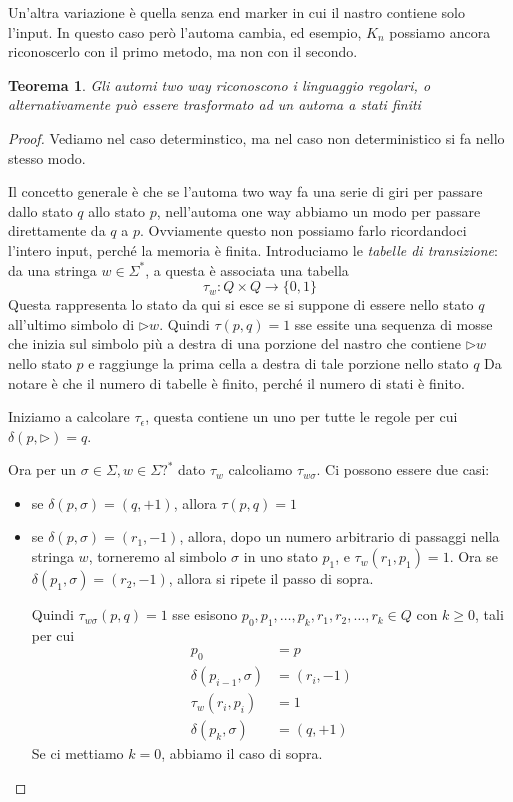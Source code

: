 \documentclass[12pt]{article}
\newtheorem{teorema}{Teorema}
\begin{document}
Un'altra variazione è quella senza end marker in cui il nastro contiene solo l'input.
In questo caso però l'automa cambia, ed esempio, $K_n$ possiamo ancora riconoscerlo con il primo metodo, ma non con il secondo.

\begin{teorema}
	Gli automi two way riconoscono i linguaggio regolari, o alternativamente può essere trasformato ad un automa a stati finiti 
\end{teorema}
\begin{proof}
	Vediamo nel caso determinstico, ma nel caso non deterministico si fa nello stesso modo.

	Il concetto generale è che se l'automa two way fa una serie di giri per passare dallo stato $q$ allo stato $p$, nell'automa one way abbiamo un modo per passare direttamente da $q$ a $p$.
	Ovviamente questo non possiamo farlo ricordandoci l'intero input, perché la memoria è finita.
	Introduciamo le \textit{tabelle di transizione}: da una stringa $w \in \Sigma^*$, a questa è associata una tabella
	$$ \tau_w : Q \times Q \rightarrow \{0, 1\} $$
	Questa rappresenta lo stato da qui si esce se si suppone di essere nello stato $q$ all'ultimo simbolo di $\rhd w$.
	Quindi $\tau(p, q) = 1$ sse essite una sequenza di mosse che inizia sul simbolo più a destra di una porzione del nastro che contiene $\rhd w$ nello stato $p$ e raggiunge la prima cella a destra di tale porzione nello stato $q$
	Da notare è che il numero di tabelle è finito, perché il numero di stati è finito.

	Iniziamo a calcolare $\tau_\epsilon$, questa contiene un uno per tutte le regole per cui $\delta(p, \rhd) = q$.

	Ora per un $\sigma \in \Sigma, w \in \Sigma?^*$ dato $\tau_w$ calcoliamo $\tau_{w\sigma}$.
	Ci possono essere due casi:
	\begin{itemize}
		\item se $\delta(p, \sigma) = (q, +1)$, allora $\tau(p, q) = 1$
		\item se $\delta(p, \sigma) = (r_1, -1)$, allora, dopo un numero arbitrario di passaggi nella stringa $w$, torneremo al simbolo $\sigma$ in uno stato $p_1$, e $\tau_w(r_1, p_1) = 1$.
			Ora se $\delta(p_1, \sigma) = (r_2, -1)$, allora si ripete il passo di sopra.

			Quindi $\tau_{w\sigma}(p, q) = 1$ sse esisono $p_0, p_1, \dots, p_k, r_1, r_2, \dots, r_k \in Q$ con $k \geq 0$, tali per cui 
			\begin{align*}
				p_0 &= p \\
				\delta(p_{i - 1}, \sigma) &= (r_i, - 1) \\
				\tau_w(r_i, p_i) &= 1 \\
				\delta(p_k, \sigma) &= (q, + 1)
			\end{align*}
			Se ci mettiamo $k = 0$, abbiamo il caso di sopra.
	\end{itemize}


\end{proof}
\end{document}

